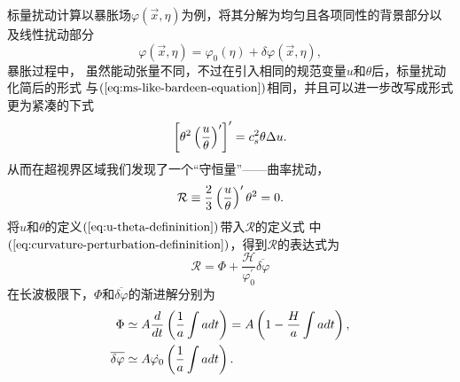 标量扰动计算以暴胀场$\varphi(\vec{x},\eta)$为例，将其分解为均匀且各项同性的背景部分以及线性扰动部分
\begin{equation}
  \varphi(\vec{x},\eta)=\varphi_{0}(\eta)+\delta\varphi(\vec{x},\eta), 
\end{equation}
暴胀过程中，
虽然能动张量不同，不过在引入相同的规范变量$u$和$\theta$后，标量扰动化简后的形式
与$(\ref{eq:ms-like-bardeen-equation})$相同，并且可以进一步改写成形式更为紧凑的下式
\begin{equation}
  \left[\theta^2\left(\frac{u}{\theta}\right)^{\prime}\right]^{\prime} =
  c_{s}^2\theta\Delta u.
\end{equation}
从而在超视界区域我们发现了一个“守恒量”——曲率扰动，
\begin{equation}
  \label{eq:curvature-perturbation-defininition}
  \mathcal{R}\equiv \frac{2}{3}\left(\frac{u}{\theta}\right)^{\prime}\theta^2 = 0.
\end{equation}
将$u$和$\theta$的定义$(\ref{eq:u-theta-defininition})$带入$\mathcal{R}$的定义式
中$(\ref{eq:curvature-perturbation-defininition})$，得到$\mathcal{R}$的表达式为
\begin{equation}
  \mathcal{R} = \Phi +
  \frac{\mathcal{H}}{\varphi^{\prime}_0}\overline{\delta\varphi}
\end{equation}
在长波极限下，$\Phi$和$\overline{\delta\varphi}$的渐进解分别为
\begin{align}
  \Phi &\simeq A\frac{d}{dt}\left(\frac{1}{a}\int a dt  \right) =
  A\left(1-\frac{H}{a}\int adt\right), \\
  \overline{\delta\varphi} &\simeq A \dot{\varphi_0}\left(\frac{1}{a}\int
  adt\right).
\end{align}

